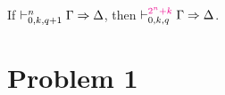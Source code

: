 \documentclass[a4paper]{article}
\begin{document}
\begin{corollary}
  If $\mathrel{\vdash^{n}_{0,k,q+1}} \Gamma \Rightarrow \Delta$, then $\mathrel{\vdash^{\textcolor{magenta}{2^n+k}}_{0,k,q}} \Gamma \Rightarrow \Delta$.
\end{corollary}

\section*{Problem 1}
\label{0001}

% 
% 
\end{document}
